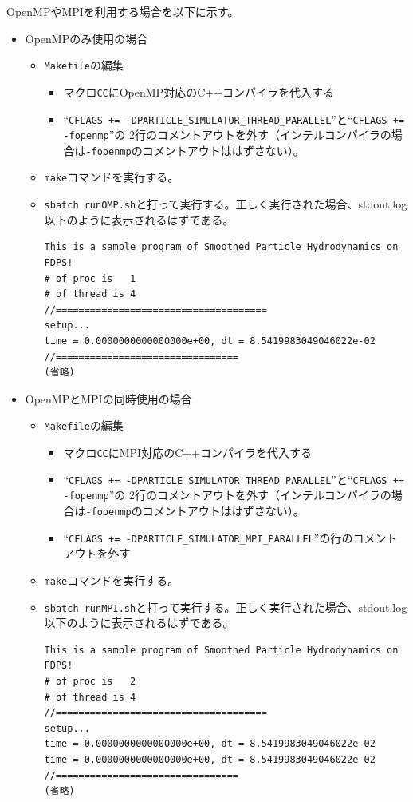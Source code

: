 \documentclass[12pt,a4paper,dvipdfmx]{jarticle}
\begin{document}
OpenMPやMPIを利用する場合を以下に示す。
\begin{itemize}
\item OpenMPのみ使用の場合
  \begin{itemize}
  \item \texttt{Makefile}の編集
    \begin{itemize}
    \item マクロ\texttt{CC}にOpenMP対応のC++コンパイラを代入する
    \item ``\texttt{CFLAGS += -DPARTICLE\_SIMULATOR\_THREAD\_PARALLEL}''と``\texttt{CFLAGS += -fopenmp}''の
      2行のコメントアウトを外す（インテルコンパイラの場合は\texttt{-fopenmp}のコメントアウトははずさない）。
    \end{itemize}
  \item \texttt{make}コマンドを実行する。
  \item \texttt{sbatch runOMP.sh}と打って実行する。正しく実行された場合、stdout.log以下のように表示されるはずである。
\begin{screen}
\begin{verbatim}
This is a sample program of Smoothed Particle Hydrodynamics on FDPS!
# of proc is   1
# of thread is 4
//=====================================
setup...
time = 0.0000000000000000e+00, dt = 8.5419983049046022e-02
//================================
(省略)
\end{verbatim}
\end{screen}
  \end{itemize}

\item OpenMPとMPIの同時使用の場合
  \begin{itemize}
  \item \texttt{Makefile}の編集
    \begin{itemize}
    \item マクロ\texttt{CC}にMPI対応のC++コンパイラを代入する
    \item ``\texttt{CFLAGS += -DPARTICLE\_SIMULATOR\_THREAD\_PARALLEL}''と``\texttt{CFLAGS += -fopenmp}''の
      2行のコメントアウトを外す（インテルコンパイラの場合は\texttt{-fopenmp}のコメントアウトははずさない）。
    \item ``\texttt{CFLAGS += -DPARTICLE\_SIMULATOR\_MPI\_PARALLEL}''の行のコメント
      アウトを外す
    \end{itemize}
  \item \texttt{make}コマンドを実行する。
  \item \texttt{sbatch runMPI.sh}と打って実行する。正しく実行された場合、stdout.log以下のように表示されるはずである。
\begin{screen}
\begin{verbatim}
This is a sample program of Smoothed Particle Hydrodynamics on FDPS!
# of proc is   2
# of thread is 4
//=====================================
setup...
time = 0.0000000000000000e+00, dt = 8.5419983049046022e-02
time = 0.0000000000000000e+00, dt = 8.5419983049046022e-02
//================================
(省略)
\end{verbatim}
\end{screen}
  \end{itemize}
\end{itemize}
\end{document}
